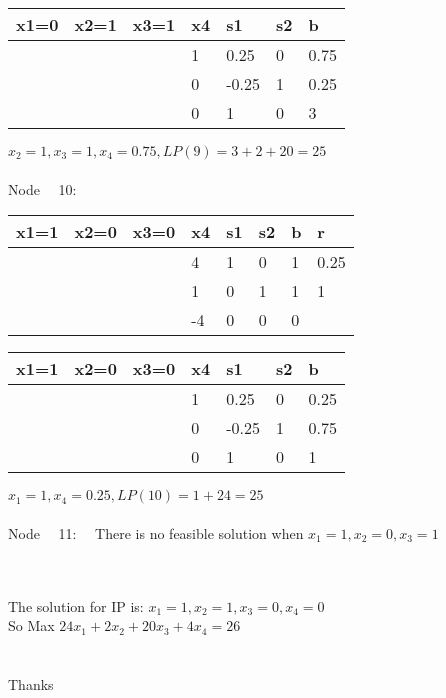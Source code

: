 \documentclass{article} %
\numberwithin{equation}{section} %
\numberwithin{figure}{section} %
\numberwithin{table}{section} %
\begin{document}
\begin{center}
\begin{tabular}{|l|l|l|l|l|l|l|}
\hline
x1=0 & x2=1 & x3=1 & x4 & s1    & s2 & b    \\ \hline
     &      &      & 1  & 0.25  & 0  & 0.75 \\ \hline
     &      &      & 0  & -0.25 & 1  & 0.25 \\ \hline
     &      &      & 0  & 1     & 0  & 3    \\ \hline
\end{tabular}
\end{center}
$x_2=1,x_3=1,x_4=0.75,LP(9)=3+2+20=25$
\\
\\
Node \ \ 10:
\begin{center}
\begin{tabular}{|l|l|l|l|l|l|l|l|}
\hline
x1=1 & x2=0 & x3=0 & x4 & s1 & s2 & b & r    \\ \hline
     &      &      & 4  & 1  & 0  & 1 & 0.25 \\ \hline
     &      &      & 1  & 0  & 1  & 1 & 1    \\ \hline
     &      &      & -4 & 0  & 0  & 0 &      \\ \hline
\end{tabular}
\end{center}
\begin{center}
\begin{tabular}{|l|l|l|l|l|l|l|}
\hline
x1=1 & x2=0 & x3=0 & x4 & s1    & s2 & b    \\ \hline
     &      &      & 1  & 0.25  & 0  & 0.25 \\ \hline
     &      &      & 0  & -0.25 & 1  & 0.75 \\ \hline
     &      &      & 0  & 1     & 0  & 1    \\ \hline
\end{tabular}
\end{center}
$x_1=1,x_4=0.25,LP(10)=1+24=25$
\\
\\
Node \ \ 11: \  \ There is no feasible solution when $x_1=1,x_2=0,x_3=1$
\\
\\
\\
\begin{center}
The solution for IP is: $x_1=1,x_2=1,x_3=0,x_4=0$
\\
So Max $24x_1+2x_2+20x_3+4x_4=26$
\\
\ \
\\
\ \
\\
Thanks
\end{center}
\end{document}
